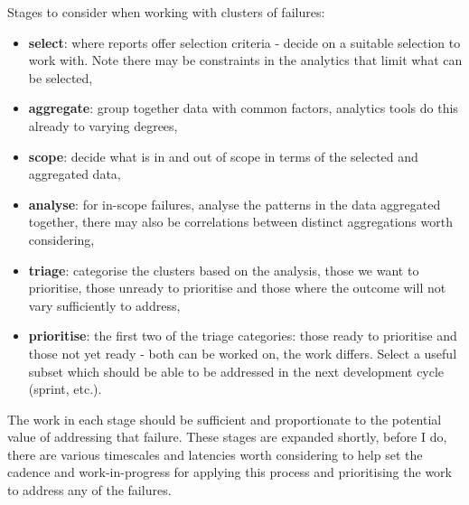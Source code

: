 Stages to consider when working with clusters of failures: 

\begin{itemize}
    \item \textbf{select}: where reports offer selection criteria - decide on a suitable selection to work with. Note there may be constraints in the analytics that limit what can be selected,
    \item \textbf{aggregate}: group together data with common factors, analytics tools do this already to varying degrees,
    \item \textbf{scope}: decide what is in and out of scope in terms of the selected and aggregated data, 
    \item \textbf{analyse}: for in-scope failures, analyse the patterns in the data aggregated together, there may also be correlations between distinct aggregations worth considering, 
    \item \textbf{triage}: categorise the clusters based on the analysis, those we want to prioritise, those unready to prioritise and those where the outcome will not vary sufficiently to address,
    \item \textbf{prioritise}: the first two of the triage categories: those ready to prioritise and those not yet ready - both can be worked on, the work differs. Select a useful subset which should be able to be addressed in the next development cycle (sprint, etc.).
\end{itemize}

The work in each stage should be sufficient and proportionate to the potential value of addressing that failure. These stages are expanded shortly, before I do, there are various timescales and latencies worth considering to help set the cadence and work-in-progress for applying this process and prioritising the work to address any of the failures.

